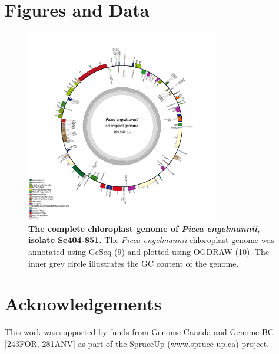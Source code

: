 \documentclass[titlepage,11pt, oneside]{article}   	%
\begin{document}
\section*{Figures and Data}
\begin{figure}[h]
\centering
\includegraphics[width=0.75\textwidth]{Se404-851}
\caption{\textbf{The complete chloroplast genome of \textit{Picea engelmannii}, isolate Se404-851.} The \textit{Picea engelmannii} chloroplast genome was annotated using GeSeq (9) and plotted using OGDRAW (10). The inner grey circle illustrates the GC content of the genome.}
\label{fig:ogdraw}
\end{figure}

\section*{Acknowledgements}
This work was supported by funds from Genome Canada and Genome BC [243FOR, 281ANV] as part of the SpruceUp (\url{www.spruce-up.ca}) project.
\end{document}
